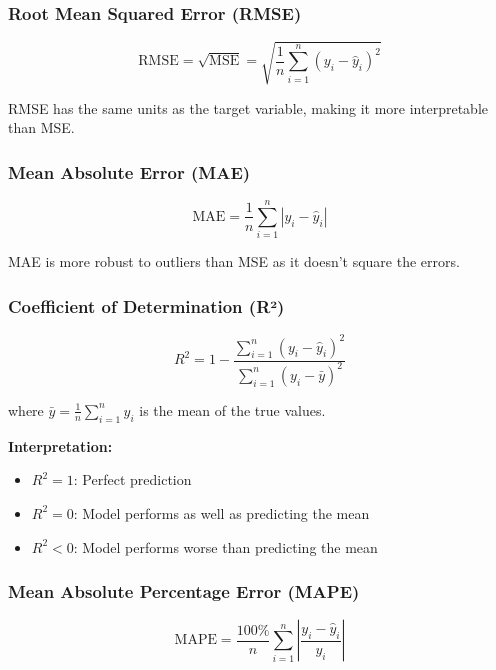 \documentclass[12pt,a4paper]{article}
\begin{document}
\subsubsection{Root Mean Squared Error (RMSE)}

\begin{equation}
    \text{RMSE} = \sqrt{\text{MSE}} = \sqrt{\frac{1}{n}\sum_{i=1}^{n}(y_i - \hat{y}_i)^2}
\end{equation}

RMSE has the same units as the target variable, making it more interpretable than MSE.

\subsubsection{Mean Absolute Error (MAE)}

\begin{equation}
    \text{MAE} = \frac{1}{n}\sum_{i=1}^{n}|y_i - \hat{y}_i|
\end{equation}

MAE is more robust to outliers than MSE as it doesn't square the errors.

\subsubsection{Coefficient of Determination (R²)}

\begin{equation}
    R^2 = 1 - \frac{\sum_{i=1}^{n}(y_i - \hat{y}_i)^2}{\sum_{i=1}^{n}(y_i - \bar{y})^2}
\end{equation}

where $\bar{y} = \frac{1}{n}\sum_{i=1}^{n}y_i$ is the mean of the true values.

\textbf{Interpretation:}
\begin{itemize}
    \item $R^2 = 1$: Perfect prediction
    \item $R^2 = 0$: Model performs as well as predicting the mean
    \item $R^2 < 0$: Model performs worse than predicting the mean
\end{itemize}

\subsubsection{Mean Absolute Percentage Error (MAPE)}

\begin{equation}
    \text{MAPE} = \frac{100\%}{n}\sum_{i=1}^{n}\left|\frac{y_i - \hat{y}_i}{y_i}\right|
\end{equation}
\end{document}
